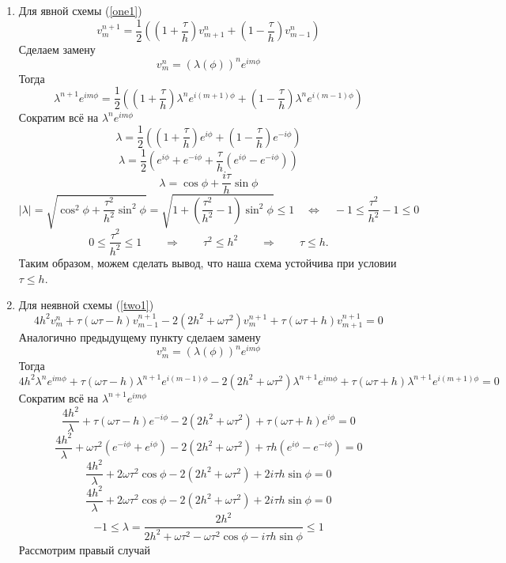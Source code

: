 \begin{enumerate}
\item Для явной схемы (\ref{one1})
\[
v_{m}^{n+1}  = \frac{1}{2}\left( \left(1 + \frac{\tau}{h}\right) v_{m+1}^n  + \left(1 - \frac{\tau}{h}\right) v_{m-1}^n \right)
\]
Сделаем замену
\[
v_m^n = 
(\lambda(\phi))^n e^{im\phi}
\]
Тогда
\[
\lambda^{n+1} e^{im\phi} = \frac{1}{2}\left( \left(1 + \frac{\tau}{h}\right) \lambda^{n} e^{i(m+1)\phi}  + \left(1 - \frac{\tau}{h}\right) \lambda^{n} e^{i(m-1)\phi}  \right)
\]
Сократим всё на $\lambda^{n} e^{im\phi} $
\[
\lambda = \frac{1}{2}\left( \left(1 + \frac{\tau}{h}\right) e^{i\phi}  + \left(1 - \frac{\tau}{h}\right) e^{-i\phi}  \right)
\]
\[
\lambda = \frac{1}{2}\left( e^{i\phi} +  e^{-i\phi} + \frac{\tau}{h} \left(e^{i\phi}  -  e^{-i\phi} \right) \right)
\]
\[
\lambda = \cos\phi + \frac{i\tau}{h} \sin\phi
\]
\[
| \lambda | = \sqrt{\cos^2\phi +  \frac{\tau^2}{h^2} \sin^2\phi} = 
 \sqrt{1 +  (\frac{\tau^2}{h^2} - 1) \sin^2\phi} \le 1 \quad \Longleftrightarrow \quad -1 \le \frac{\tau^2}{h^2} - 1 \le 0
\]
\[
0 \le \frac{\tau^2}{h^2} \le 1 \qquad \Longrightarrow \qquad  \tau^2 \le h^2 \qquad \Longrightarrow \qquad \tau \le h. 
\]
Таким образом, можем сделать вывод, что наша схема устойчива при условии $\tau \le h$.
\item Для неявной схемы (\ref{two1})
\[
4h^2 v_m^n + \tau
\left(\omega \tau -h \right) v_{m-1}^{n+1} -
2\left(2h^2 + \omega \tau^2\right) v_{m}^{n+1} +
\tau \left( \omega \tau + h \right) v_{m+1}^{n+1}= 0
\]
Аналогично предыдущему пункту сделаем замену
\[
v_m^n = 
(\lambda(\phi))^n e^{im\phi}
\]
Тогда
\[
4h^2 \lambda^{n} e^{im\phi} + \tau
\left(\omega \tau -h \right) \lambda^{n+1} e^{i(m-1)\phi} -
2\left(2h^2 + \omega \tau^2\right) \lambda^{n+1} e^{im\phi} +
\tau \left( \omega \tau + h \right) \lambda^{n+1} e^{i(m+1)\phi}= 0
\]
Сократим всё на $\lambda^{n+1} e^{im\phi} $
\[
\frac{4h^2}{\lambda} + \tau
\left(\omega \tau -h \right)  e^{-i\phi} -
2\left(2h^2 + \omega \tau^2\right) +
\tau \left( \omega \tau + h \right)  e^{i\phi}= 0
\]
\[
\frac{4h^2}{\lambda} + \omega \tau^2 
\left(  e^{-i\phi} + e^{i\phi} \right)  -
2\left(2h^2 + \omega \tau^2\right) +
\tau h \left(  e^{i\phi} - e^{-i\phi} \right)   = 0
\]
\[
\frac{4h^2}{\lambda} + 2\omega \tau^2 
\cos\phi  -
2\left(2h^2 + \omega \tau^2\right) +
2 i\tau h \sin\phi  = 0
\]
\[
\frac{4h^2}{\lambda} + 2\omega \tau^2 
\cos\phi  -
2\left(2h^2 + \omega \tau^2\right) +
2 i\tau h \sin\phi  = 0
\]
\[
-1 \le \lambda = \frac{2h^2}{2h^2 + \omega \tau^2 - \omega \tau^2 
\cos\phi  -  i\tau h \sin\phi} \le 1
\]
Рассмотрим правый случай
\[
\]
\end{enumerate}
